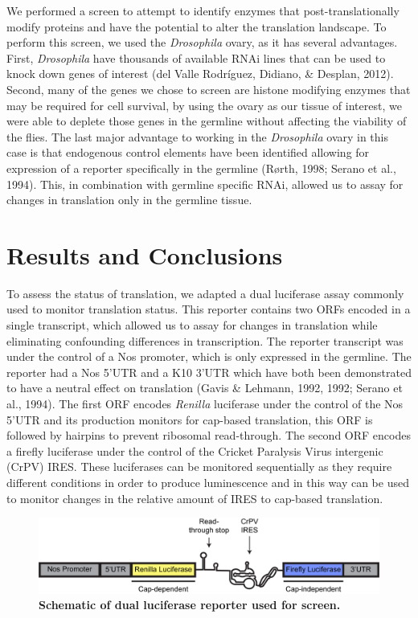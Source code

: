 \documentclass[12pt,oneside]{reedthesis}
\begin{document}
We performed a screen to attempt to identify enzymes that
post-translationally modify proteins and have the potential to alter the
translation landscape. To perform this screen, we used the \emph{Drosophila} ovary, as it has several advantages. First, \emph{Drosophila} have thousands
of available RNAi lines that can be used to knock down genes of interest
(del Valle Rodríguez, Didiano, \& Desplan, 2012). Second, many of the genes we
chose to screen are histone modifying enzymes that may be required for
cell survival, by using the ovary as our tissue of interest, we were
able to deplete those genes in the germline without affecting the
viability of the flies. The last major advantage to working in the
\emph{Drosophila} ovary in this case is that endogenous control elements have
been identified allowing for expression of a reporter specifically in
the germline (Rørth, 1998; Serano et al., 1994). This, in combination with
germline specific RNAi, allowed us to assay for changes in translation
only in the germline tissue.

\hypertarget{results-and-conclusions}{%
\section{Results and Conclusions}\label{results-and-conclusions}}

To assess the status of translation, we adapted a dual luciferase assay
commonly used to monitor translation status. This reporter contains two
ORFs encoded in a single transcript, which allowed us to assay for
changes in translation while eliminating confounding differences in
transcription. The reporter transcript was under the control of a Nos
promoter, which is only expressed in the germline. The reporter had a
Nos 5'UTR and a K10 3'UTR which have both been demonstrated to have a
neutral effect on translation (Gavis \& Lehmann, 1992, 1992; Serano et al., 1994). The first ORF encodes
\emph{Renilla} luciferase under the control of the Nos 5'UTR and its
production monitors for cap-based translation, this ORF is followed by
hairpins to prevent ribosomal read-through. The second ORF encodes a
firefly luciferase under the control of the Cricket Paralysis Virus
intergenic (CrPV) IRES. These luciferases can be monitored sequentially
as they require different conditions in order to produce luminescence
and in this way can be used to monitor changes in the relative amount of
IRES to cap-based translation.
\begin{figure}

{\centering \includegraphics[width=0.97\linewidth]{./figure/Screen/Construct} 

}

\caption[\textbf{Schematic of dual luciferase reporter used for screen.}]{\textbf{Schematic of dual luciferase reporter used for screen.}}\label{fig:Screen-fig-1}
\end{figure}
\end{document}
